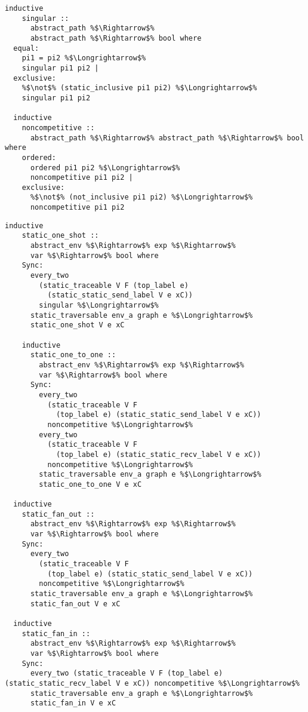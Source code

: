 \begin{lstlisting}[style=codestyle1, escapechar=\%]
  inductive
    singular ::
      abstract_path %$\Rightarrow$%
      abstract_path %$\Rightarrow$% bool where
  equal:
    pi1 = pi2 %$\Longrightarrow$% 
    singular pi1 pi2 |
  exclusive:
    %$\not$% (static_inclusive pi1 pi2) %$\Longrightarrow$% 
    singular pi1 pi2

  inductive
    noncompetitive ::
      abstract_path %$\Rightarrow$% abstract_path %$\Rightarrow$% bool where
    ordered:
      ordered pi1 pi2 %$\Longrightarrow$% 
      noncompetitive pi1 pi2 |
    exclusive:
      %$\not$% (not_inclusive pi1 pi2) %$\Longrightarrow$% 
      noncompetitive pi1 pi2
  \end{lstlisting}

\begin{lstlisting}[style=codestyle1, escapechar=\%]
  inductive
    static_one_shot ::
      abstract_env %$\Rightarrow$% exp %$\Rightarrow$%
      var %$\Rightarrow$% bool where
    Sync:
      every_two
        (static_traceable V F (top_label e)
          (static_static_send_label V e xC))
        singular %$\Longrightarrow$%
      static_traversable env_a graph e %$\Longrightarrow$%
      static_one_shot V e xC 

    inductive
      static_one_to_one ::
        abstract_env %$\Rightarrow$% exp %$\Rightarrow$%
        var %$\Rightarrow$% bool where
      Sync:
        every_two
          (static_traceable V F
            (top_label e) (static_static_send_label V e xC))
          noncompetitive %$\Longrightarrow$%
        every_two
          (static_traceable V F
            (top_label e) (static_static_recv_label V e xC))
          noncompetitive %$\Longrightarrow$%
        static_traversable env_a graph e %$\Longrightarrow$%
        static_one_to_one V e xC 

  inductive
    static_fan_out ::
      abstract_env %$\Rightarrow$% exp %$\Rightarrow$%
      var %$\Rightarrow$% bool where
    Sync:
      every_two
        (static_traceable V F
          (top_label e) (static_static_send_label V e xC))
        noncompetitive %$\Longrightarrow$%
      static_traversable env_a graph e %$\Longrightarrow$%
      static_fan_out V e xC 

  inductive
    static_fan_in ::
      abstract_env %$\Rightarrow$% exp %$\Rightarrow$%
      var %$\Rightarrow$% bool where
    Sync:
      every_two (static_traceable V F (top_label e) (static_static_recv_label V e xC)) noncompetitive %$\Longrightarrow$%
      static_traversable env_a graph e %$\Longrightarrow$%
      static_fan_in V e xC

    \end{lstlisting}

